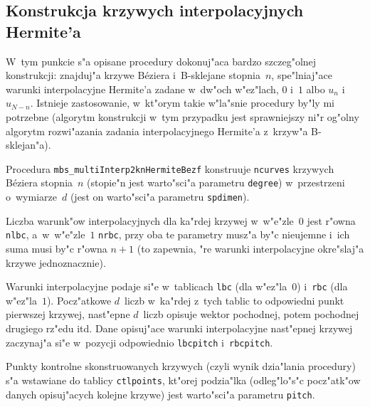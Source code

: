 \subsection{Konstrukcja krzywych interpolacyjnych Hermite'a}

W~tym punkcie s"a opisane procedury dokonuj"aca bardzo szczeg"olnej
konstrukcji: znajduj"a krzywe B\'{e}ziera i~B-sklejane stopnia~$n$,
spe"lniaj"ace warunki interpolacyjne Hermite'a zadane w~dw"och w"ez"lach,
$0$ i~$1$ albo $u_n$ i~$u_{N-n}$. Istnieje zastosowanie, w~kt"orym takie
w"la"snie procedury by"ly mi potrzebne (algorytm konstrukcji w~tym
przypadku jest sprawniejszy ni"r og"olny algorytm rozwi"azania zadania
interpolacyjnego Hermite'a z~krzyw"a B-sklejan"a).

\vspace{\bigskipamount}
\begin{sloppypar}
Procedura \texttt{mbs\_multiInterp2knHermiteBezf} konstruuje \texttt{ncurves}
krzywych B\'{e}ziera stopnia~$n$ (stopie"n jest warto"sci"a parametru
\texttt{degree}) w~przestrzeni o~wymiarze~$d$ (jest on warto"sci"a parametru
\texttt{spdimen}).
\end{sloppypar}

Liczba warunk"ow interpolacyjnych dla ka"rdej krzywej
w~w"e"zle~$0$ jest r"owna \texttt{nlbc}, a~w~w"e"zle~$1$
\texttt{nrbc}, przy oba te parametry musz"a by"c nieujemne i~ich suma musi
by"c r"owna $n+1$ (to zapewnia, "re warunki interpolacyjne okre"slaj"a
krzywe jednoznacznie).

Warunki interpolacyjne podaje si"e w~tablicach \texttt{lbc} (dla w"ez"la~$0$)
i~\texttt{rbc} (dla w"ez"la~$1$). Pocz"atkowe $d$~liczb w~ka"rdej z~tych
tablic to odpowiedni punkt pierwszej krzywej, nast"epne $d$~liczb opisuje
wektor pochodnej, potem pochodnej drugiego rz"edu itd.
Dane opisuj"ace warunki interpolacyjne nast"epnej krzywej zaczynaj"a si"e
w~pozycji odpowiednio \texttt{lbcpitch} i~\texttt{rbcpitch}.

Punkty kontrolne skonstruowanych krzywych (czyli wynik dzia"lania procedury)
s"a wstawiane do tablicy \texttt{ctlpoints}, kt"orej podzia"lka
(odleg"lo"s"c pocz"atk"ow danych opisuj"acych kolejne krzywe) jest
warto"sci"a parametru \texttt{pitch}.

